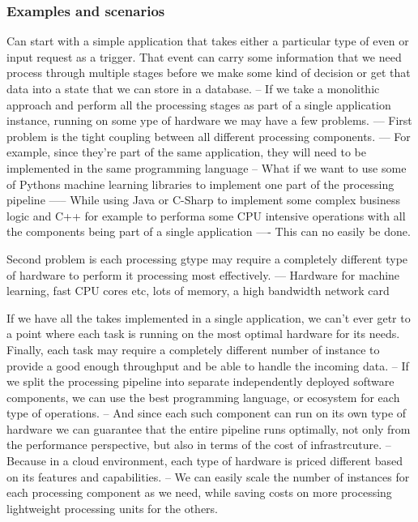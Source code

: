\documentclass[a4paper, 11pt]{book}
\begin{document}
{    \subsubsection{Examples and scenarios}
    Can start with a simple application that takes either a particular type of even or input request as a trigger.
    That event can carry some information that we need process through multiple stages before we make some kind of decision or get that data into a state that we can store in a database.
    -- If we take a monolithic approach and perform all the processing stages as part of a single application instance, running on some ype of hardware we may have a few problems.
    --- First problem is the tight coupling between all different processing components.
    --- For example, since they're part of the same application, they will need to be implemented in the same programming language
    -- What if we want to use some of Pythons machine learning libraries to implement one part of the processing pipeline
    ----- While using Java or C-Sharp to implement some complex business logic and C++ for example to performa some CPU intensive operations with all the components being part of a single application
    ---- This can no easily be done.

    Second problem is each processing gtype may require a completely different type of hardware to perform it processing most effectively.
    --- Hardware for machine learning, fast CPU cores etc, lots of memory, a high bandwidth network card

    If we have all the takes implemented in a single application, we can't ever getr to a point where each task is running on the most optimal hardware for its needs.
    Finally, each task may require a completely different number of instance to provide a good enough throughput and be able to handle the incoming data.
    -- If we split the processing pipeline into separate independently deployed software components, we can use the best programming language, or ecosystem for each type of operations.
    -- And since each such component can run on its own type of hardware we can guarantee that the entire pipeline runs optimally, not only from the performance perspective, but also in terms of the cost of infrastrcuture.
    -- Because in a cloud environment, each type of hardware is priced different based on its features and capabilities.
    -- We can easily scale the number of instances for each processing component as we need, while saving costs on more processing lightweight processing units for the others.

}
\end{document}
